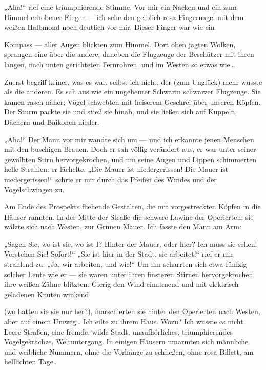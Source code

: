 „Aha!“ rief eine triumphierende Stimme. Vor mir ein Nacken und ein
zum Himmel erhobener Finger — ich sehe den gelblich-rosa
Fingernagel mit dem weißen Halbmond noch deutlich vor mir. Dieser
Finger war wie ein

Kompass — aller Augen blickten zum Himmel. Dort oben jagten Wolken,
sprangen eine über die andere, daneben die Flugzeuge der Beschützer
mit ihren langen, nach unten gerichteten Fernrohren, und im Westen
so etwas wie\ldots{}

Zuerst begriff keiner, was es war, selbst ich nicht, der (zum
Unglück) mehr wusste als die anderen. Es sah aus wie ein ungeheurer
Schwarm schwarzer Flugzeuge. Sie kamen rasch näher; Vögel schwebten
mit heiserem Geschrei über unseren Köpfen. Der Sturm packte sie und
stieß sie hinab, und sie ließen sich auf Kuppeln, Dächern und
Baikonen nieder.

„Aha!“ Der Mann vor mir wandte sich um — und ich erkannte jenen
Menschen mit den buschigen Brauen. Doch er sah völlig verändert
aus, er war unter seiner gewölbten Stirn hervorgekrochen, und um
seine Augen und Lippen schimmerten helle Strahlen: er lächelte.
„Die Mauer ist niedergerissen! Die Mauer ist niedergerissen!“
schrie er mir durch das Pfeifen des Windes und der Vogelschwingen
zu.

Am Ende des Prospekts fliehende Gestalten, die mit vorgestreckten
Köpfen in die Häuser rannten. In der Mitte der Straße die schwere
Lawine der Operierten; sie wälzte sich nach Westen, zur Grünen
Mauer. Ich fasste den Mann am Arm:

„Sagen Sie, wo ist sie, wo ist I? Hinter der Mauer, oder hier? Ich
muss sie sehen! Verstehen Sie! Sofort!“ „Sie ist hier in der Stadt,
sie arbeitet!“ rief er mir strahlend zu. „Ja, wir arbeiten, und
wie!“ Um ihn scharrten sich etwa fünfzig solcher Leute wie er — sie
waren unter ihren finsteren Stirnen hervorgekrochen, ihre weißen
Zähne blitzten. Gierig den Wind einatmend und mit elektrisch
geladenen Knuten winkend

(wo hatten sie sie nur her?), marschierten sie hinter den
Operierten nach Westen, aber auf einem Umweg\ldots{} Ich eilte zu ihrem
Haus. Wozu? Ich wusste es nicht. Leere Straßen, eine fremde, wilde
Stadt, unaufhörliches, triumphierendes Vogelgekrächze,
Weltuntergang. In einigen Häusern umarmten sich männliche und
weibliche Nummern, ohne die Vorhänge zu schließen, ohne rosa
Billett, am helllichten Tage\ldots{}

